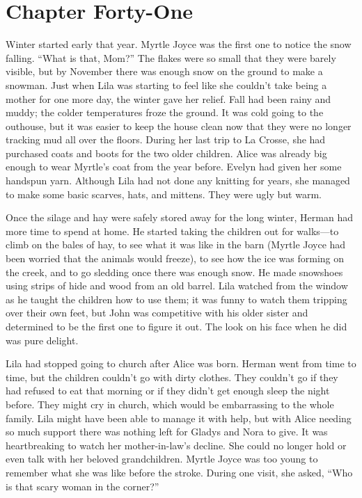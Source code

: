 \documentclass[
  letterpaper,
]{book}
\begin{document}

\chapter{Chapter Forty-One}\label{chapter-forty-one}

Winter started early that year. Myrtle Joyce was the first one to notice
the snow falling. ``What is that, Mom?'' The flakes were so small that
they were barely visible, but by November there was enough snow on the
ground to make a snowman. Just when Lila was starting to feel like she
couldn't take being a mother for one more day, the winter gave her
relief. Fall had been rainy and muddy; the colder temperatures froze the
ground. It was cold going to the outhouse, but it was easier to keep the
house clean now that they were no longer tracking mud all over the
floors. During her last trip to La Crosse, she had purchased coats and
boots for the two older children. Alice was already big enough to wear
Myrtle's coat from the year before. Evelyn had given her some handspun
yarn. Although Lila had not done any knitting for years, she managed to
make some basic scarves, hats, and mittens. They were ugly but warm.

Once the silage and hay were safely stored away for the long winter,
Herman had more time to spend at home. He started taking the children
out for walks---to climb on the bales of hay, to see what it was like in
the barn (Myrtle Joyce had been worried that the animals would freeze),
to see how the ice was forming on the creek, and to go sledding once
there was enough snow. He made snowshoes using strips of hide and wood
from an old barrel. Lila watched from the window as he taught the
children how to use them; it was funny to watch them tripping over their
own feet, but John was competitive with his older sister and determined
to be the first one to figure it out. The look on his face when he did
was pure delight.

Lila had stopped going to church after Alice was born. Herman went from
time to time, but the children couldn't go with dirty clothes. They
couldn't go if they had refused to eat that morning or if they didn't
get enough sleep the night before. They might cry in church, which would
be embarrassing to the whole family. Lila might have been able to manage
it with help, but with Alice needing so much support there was nothing
left for Gladys and Nora to give. It was heartbreaking to watch her
mother-in-law's decline. She could no longer hold or even talk with her
beloved grandchildren. Myrtle Joyce was too young to remember what she
was like before the stroke. During one visit, she asked, ``Who is that
scary woman in the corner?''
\end{document}
